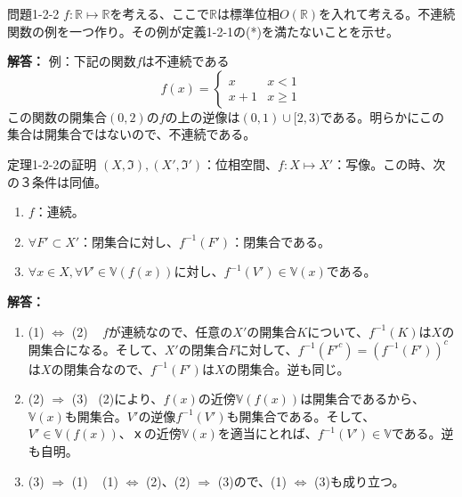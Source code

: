 \documentclass{jsarticle}
\begin{document}
\begin{itembox}[l]{問題1-2-2}
$f: \mathbb{R} \mapsto \mathbb{R}$を考える、ここで$\mathbb{R}$は標準位相$O(\mathbb{R})$を入れて考える。不連続関数の例を一つ作り。その例が定義1-2-1の(*)を満たないことを示せ。
\end{itembox}
{\bf 解答：}
例：下記の関数$f$は不連続である
\[f(x)=
\begin{cases}
x & x<1 \\
x+1 & x \ge 1
\end{cases}
\]
この関数の開集合$(0,2)$の$f$の上の逆像は$(0,1)\cup[2,3)$である。明らかにこの集合は開集合ではないので、不連続である。

\begin{itembox}[l]{定理1-2-2の証明}
$(X,\mathfrak{I}),(X',\mathfrak{I}')$：位相空間、$f:X \mapsto X'$：写像。この時、次の３条件は同値。
\begin{enumerate}
\item $f$：連続。
\item $\forall F' \subset X'$：閉集合に対し、$f^{-1}(F')$：閉集合である。
\item $\forall x \in X,\forall V' \in \mathbb{V}(f(x))$に対し、$f^{-1}(V') \in \mathbb{V}(x)$である。
\end{enumerate}
\end{itembox}
{\bf 解答：}
\begin{enumerate}
\item
(1) $\Longleftrightarrow$ (2) \,\,\, $f$が連続なので、任意の$X'$の開集合$K$について、$f^{-1}(K)$は$X$の開集合になる。そして、$X'$の閉集合$F$に対して、$f^{-1}({F'}^c)=(f^{-1}(F'))^c$は$X$の閉集合なので、$f^{-1}(F')$は$X$の閉集合。逆も同じ。
\item
(2) $\Longrightarrow$ (3) \,\,\,(2)により、$f(x)$の近傍$\mathbb{V}(f(x))$は開集合であるから、$\mathbb{V}(x)$も開集合。$V'$の逆像$f^{-1}(V')$も開集合である。そして、$V' \in \mathbb{V}(f(x))$、$ｘ$の近傍$\mathbb{V}(x)$を適当にとれば、$f^{-1}(V') \in \mathbb{V}$である。逆も自明。
\item
(3) $\Longrightarrow$ (1) \,\,\, (1) $\Longleftrightarrow$ (2)、(2) $\Longrightarrow$ (3)ので、(1) $\Longleftrightarrow$ (3)も成り立つ。
\end{enumerate}
\end{document}
